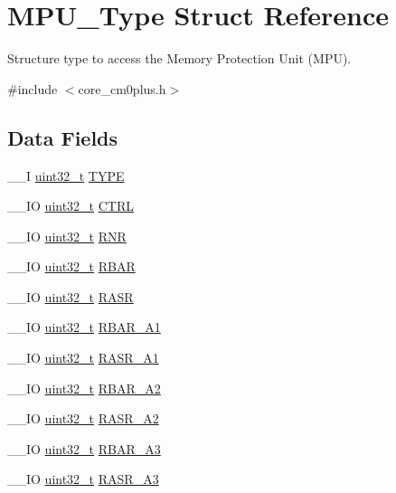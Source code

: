 \hypertarget{struct_m_p_u___type}{\section{M\-P\-U\-\_\-\-Type Struct Reference}
\label{struct_m_p_u___type}
}


Structure type to access the Memory Protection Unit (M\-P\-U).  




{\ttfamily \#include $<$core\-\_\-cm0plus.\-h$>$}

\subsection*{Data Fields}
\begin{DoxyCompactItemize}
\item 
\-\_\-\-\_\-\-I \hyperlink{stdint_8h_a435d1572bf3f880d55459d9805097f62}{uint32\-\_\-t} \hyperlink{struct_m_p_u___type_a6ae8a8c3a4909ae41447168d793608f7}{T\-Y\-P\-E}
\item 
\-\_\-\-\_\-\-I\-O \hyperlink{stdint_8h_a435d1572bf3f880d55459d9805097f62}{uint32\-\_\-t} \hyperlink{struct_m_p_u___type_aab33593671948b93b1c0908d78779328}{C\-T\-R\-L}
\item 
\-\_\-\-\_\-\-I\-O \hyperlink{stdint_8h_a435d1572bf3f880d55459d9805097f62}{uint32\-\_\-t} \hyperlink{struct_m_p_u___type_afd8de96a5d574c3953e2106e782f9833}{R\-N\-R}
\item 
\-\_\-\-\_\-\-I\-O \hyperlink{stdint_8h_a435d1572bf3f880d55459d9805097f62}{uint32\-\_\-t} \hyperlink{struct_m_p_u___type_a3f2e2448a77aadacd9f394f6c4c708d9}{R\-B\-A\-R}
\item 
\-\_\-\-\_\-\-I\-O \hyperlink{stdint_8h_a435d1572bf3f880d55459d9805097f62}{uint32\-\_\-t} \hyperlink{struct_m_p_u___type_adc65d266d15ce9ba57b3d127e8267f03}{R\-A\-S\-R}
\item 
\-\_\-\-\_\-\-I\-O \hyperlink{stdint_8h_a435d1572bf3f880d55459d9805097f62}{uint32\-\_\-t} \hyperlink{struct_m_p_u___type_a4dbcffa0a71c31e521b645b34b40e639}{R\-B\-A\-R\-\_\-\-A1}
\item 
\-\_\-\-\_\-\-I\-O \hyperlink{stdint_8h_a435d1572bf3f880d55459d9805097f62}{uint32\-\_\-t} \hyperlink{struct_m_p_u___type_a94222f9a8637b5329016e18f08af7185}{R\-A\-S\-R\-\_\-\-A1}
\item 
\-\_\-\-\_\-\-I\-O \hyperlink{stdint_8h_a435d1572bf3f880d55459d9805097f62}{uint32\-\_\-t} \hyperlink{struct_m_p_u___type_a8703a00626dba046b841c0db6c78c395}{R\-B\-A\-R\-\_\-\-A2}
\item 
\-\_\-\-\_\-\-I\-O \hyperlink{stdint_8h_a435d1572bf3f880d55459d9805097f62}{uint32\-\_\-t} \hyperlink{struct_m_p_u___type_a0aac7727a6225c6aa00627c36d51d014}{R\-A\-S\-R\-\_\-\-A2}
\item 
\-\_\-\-\_\-\-I\-O \hyperlink{stdint_8h_a435d1572bf3f880d55459d9805097f62}{uint32\-\_\-t} \hyperlink{struct_m_p_u___type_a9fda17c37b85ef317c7c8688ff8c5804}{R\-B\-A\-R\-\_\-\-A3}
\item 
\-\_\-\-\_\-\-I\-O \hyperlink{stdint_8h_a435d1572bf3f880d55459d9805097f62}{uint32\-\_\-t} \hyperlink{struct_m_p_u___type_aced0b908173b9a4bae4f59452f0cdb0d}{R\-A\-S\-R\-\_\-\-A3}
\end{DoxyCompactItemize}


